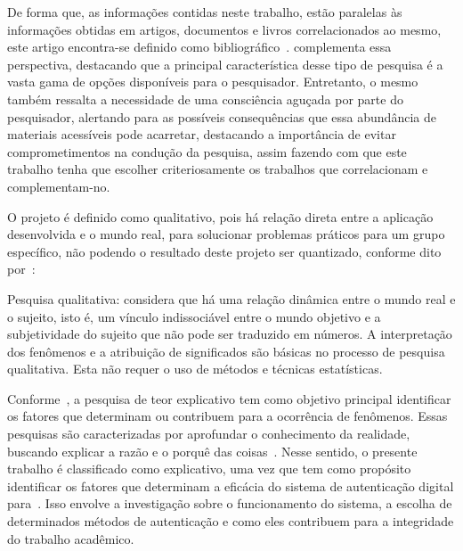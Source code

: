 
De forma que, as informações contidas neste trabalho, estão paralelas
às informações obtidas em artigos, documentos e livros correlacionados
ao mesmo, este artigo encontra-se definido como bibliográfico~\cite{
    prodanov2013}.
\textcite{gil2017} complementa essa perspectiva, destacando que a principal
característica desse tipo de pesquisa é a vasta gama de opções disponíveis
para o pesquisador.
Entretanto, o mesmo também ressalta a necessidade de uma consciência aguçada
por parte do pesquisador, alertando para as possíveis consequências que essa
abundância de materiais acessíveis pode acarretar, destacando a importância de
evitar comprometimentos na condução da pesquisa, assim fazendo com que este
trabalho
tenha que escolher criteriosamente os trabalhos que correlacionam e
complementam-no.

O projeto é definido como qualitativo, pois há relação direta entre
a aplicação desenvolvida e o mundo real, para solucionar problemas práticos
para um grupo específico, não podendo o resultado deste projeto ser quantizado,
conforme dito por~\textcite{prodanov2013}:
\begin{citacao}
    Pesquisa qualitativa: considera que há uma relação dinâmica
    entre o mundo real e o sujeito, isto é, um vínculo indissociável
    entre o mundo objetivo e a subjetividade do sujeito que não pode
    ser traduzido em números.
    A interpretação dos fenômenos e a atribuição de significados são
    básicas no processo de pesquisa qualitativa.
    Esta não requer o uso de métodos e técnicas estatísticas.
    \cite[p.~70]{prodanov2013}
\end{citacao}

Conforme~\textcite{gil2017}, a pesquisa de teor explicativo tem como objetivo principal
identificar os fatores que determinam ou contribuem para a ocorrência de
fenômenos.
Essas pesquisas são caracterizadas por aprofundar o conhecimento da realidade,
buscando explicar a razão e o porquê das coisas~\cite{gil2017}.
Nesse sentido, o presente trabalho é classificado como explicativo,
uma vez que tem como propósito identificar os fatores que determinam a
eficácia do sistema de autenticação digital para~.
Isso envolve a investigação sobre o funcionamento do sistema, a escolha de
determinados métodos de autenticação e como eles contribuem para a integridade
do trabalho acadêmico.

